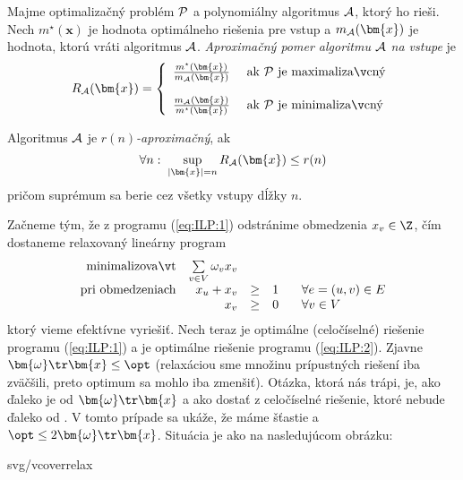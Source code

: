 \begin{framed}
  \begin{dfn}
    Majme optimalizačný problém ${\cal P}$ a polynomiálny algoritmus ${\cal A}$, ktorý ho rieši. 
    Nech $m^\star(\bm{x})$ je hodnota optimálneho riešenia pre vstup  a
    $m_{\cal A}(\bm{x})$ je hodnota, ktorú vráti algoritmus $\cal A$. {\em Aproximačný
    pomer algoritmu $\cal A$ na vstupe }je
    $$R_{\cal A}(\bm{x})=\left\{\begin{array}{ll}
        \frac{m^\star(\bm{x})}{m_{\cal A}(\bm{x})}&\text{\ ak $\cal P$ je maximalizačný}\\[3ex]
      \frac{m_{\cal A}(\bm{x})}{m^\star(\bm{x})}&\text{\ ak $\cal P$ je minimalizačný}\end{array}\right.$$
    
  \noindent  
   Algoritmus $\cal A$ je {\em $r(n)$-aproximačný}, ak 
  $$\forall n:\;\sup_{|\bm{x}|=n}R_{\cal A}(\bm{x})\le r(n)$$
 pričom suprémum sa berie cez všetky vstupy dĺžky $n$.

  \end{dfn}
\end{framed}



Začneme tým, že z programu (\ref{eq:ILP:1}) odstránime obmedzenia $x_v\in\Z$, čím
dostaneme relaxovaný lineárny program
\begin{equation}
\label{eq:ILP:2}
\begin{array}{rrcll}
  {\rm minimalizovať}     & \multicolumn{1}{l}{\sum\limits_{v\in V}\omega_vx_v}\\
  {\rm pri\ obmedzeniach} & x_u + x_v&\ge&1& \;\;\;\forall e=(u,v)\in E\\
                          & x_v&\ge&0& \;\;\;\forall v\in V\\
\end{array}
\end{equation}
ktorý vieme efektívne vyriešiť. Nech teraz \opt je optimálne (celočíselné)
riešenie programu (\ref{eq:ILP:1}) a  je optimálne riešenie programu
(\ref{eq:ILP:2}).  Zjavne $\bm{\omega}\tr\bm{x}\le\opt$ (relaxáciou sme množinu
prípustných riešení iba zväčšili, preto optimum sa mohlo iba zmenšiť). Otázka,
ktorá nás trápi, je, ako ďaleko je \opt od  $\bm{\omega}\tr\bm{x}$ a ako dostať
z  celočíselné riešenie, ktoré nebude ďaleko od \opt.  V tomto prípade sa
ukáže, že máme šťastie a $\opt\le2\bm{\omega}\tr\bm{x}$.  Situácia je ako na
nasledujúcom obrázku:

\begin{myfig}{0.7\textwidth}{svg/vcoverrelax}
\end{myfig}

